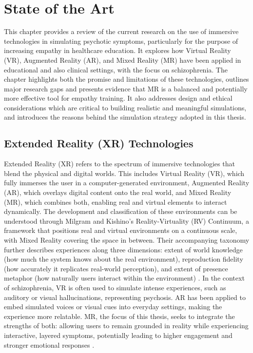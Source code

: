 \chapter{State of the Art}
\label{ch:background}

This chapter provides a review of the current research on the use of immersive technologies in simulating psychotic symptoms, particularly for the purpose of increasing empathy in healthcare education. It explores how Virtual Reality (VR), Augmented Reality (AR), and Mixed Reality (MR) have been applied in educational and also clinical settings, with the focus on schizophrenia. The chapter highlights both the promise and limitations of these technologies, outlines major research gaps and presents evidence that MR is a balanced and potentially more effective tool for empathy training. It also addresses design and ethical considerations which are critical to building realistic and meaningful simulations, and introduces the reasons behind the simulation strategy adopted in this thesis.

\section{Extended Reality (XR) Technologies}
Extended Reality (XR) refers to the spectrum of immersive technologies that blend the physical and digital worlds. This includes Virtual Reality (VR), which fully immerses the user in a computer-generated environment, Augmented Reality (AR), which overlays digital content onto the real world, and Mixed Reality (MR), which combines both, enabling real and virtual elements to interact dynamically. The development and classification of these environments can be understood through Milgram and Kishino’s Reality-Virtuality (RV) Continuum, a framework that positions real and virtual environments on a continuous scale, with Mixed Reality covering the space in between. Their accompanying taxonomy further describes experiences along three dimensions: extent of world knowledge (how much the system knows about the real environment), reproduction fidelity (how accurately it replicates real-world perception), and extent of presence metaphor (how naturally users interact within the environment) \cite{Skarbez2021}. In the context of schizophrenia, VR is often used to simulate intense experiences, such as auditory or visual hallucinations, representing psychosis. AR has been applied to embed simulated voices or visual cues into everyday settings, making the experience more relatable. MR, the focus of this thesis, seeks to integrate the strengths of both: allowing users to remain grounded in reality while experiencing interactive, layered symptoms, potentially leading to higher engagement and stronger emotional responses \cite{Krogmeier2024, Silva2017, Zare-Bidaki2022}.



